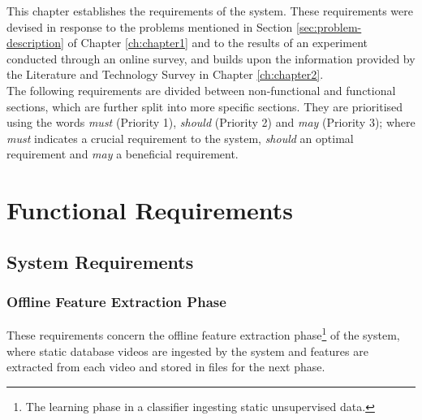 This chapter establishes the requirements of the system. These requirements were devised in response to the problems mentioned in Section \ref{sec:problem-description} of Chapter \ref{ch:chapter1} and to the results of an experiment conducted through an online survey, and builds upon the information provided by the Literature and Technology Survey in Chapter \ref{ch:chapter2}.\\

The following requirements are divided between non-functional and functional sections, which are further split into more specific sections. They are prioritised using the words \textit{must} (Priority 1), \textit{should} (Priority 2) and \textit{may} (Priority 3); where \textit{must} indicates a crucial requirement to the system, \textit{should} an optimal requirement and \textit{may} a beneficial requirement.

\section{Functional Requirements}

\subsection{System Requirements}

\subsubsection{Offline Feature Extraction Phase}

These requirements concern the offline feature extraction phase\footnote{The learning phase in a classifier ingesting static unsupervised data.} of the system, where static database videos are ingested by the system and features are extracted from each video and stored in files for the next phase.

